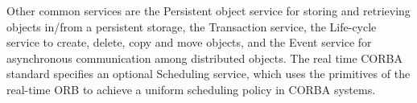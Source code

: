 Other common services are the Persistent object service for
storing and retrieving objects in/from a persistent storage, the
Transaction service, the Life-cycle service to create, delete,
copy and move objects, and the Event service for asynchronous
communication among distributed objects. The real time CORBA
standard specifies an optional Scheduling service, which uses the
primitives of the real-time ORB to achieve a uniform scheduling
policy in CORBA systems.



%
